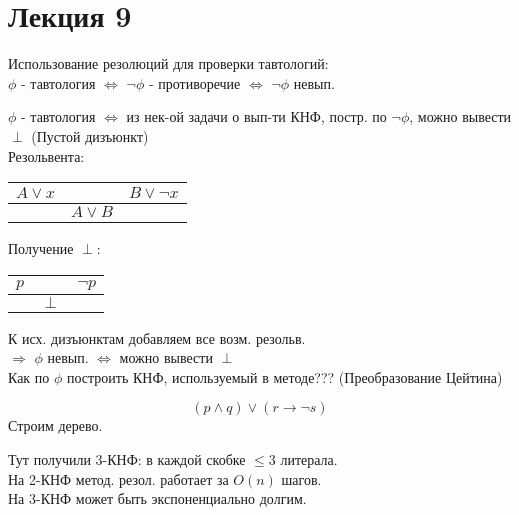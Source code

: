 \section{Лекция 9}
Использование резолюций для проверки тавтологий: \\

$\phi$ - тавтология $\iff$ $\neg \phi$ - противоречие $\iff$ $\neg \phi$ невып. 

$\phi$ - тавтология $\iff$ из нек-ой задачи о вып-ти КНФ, постр. по $\neg \phi$, можно вывести $\perp$ (Пустой дизъюнкт)\\

Резольвента:
\begin{center}
\begin{tabular}{ c c c } 
 $A \lor x$ & & $B \lor \neg x$ \\ 
 \hline
            & $A \lor B$ & 
\end{tabular}
\end{center}

Получение $\perp$:
\begin{center}
\begin{tabular}{ c c c } 
  $p$ & & $\neg p$ \\
 \hline
      & $\perp$ &
\end{tabular}
\end{center}
К исх. дизъюнктам добавляем все возм. резольв. \\
$\Rightarrow$ $\phi$ невып. $\iff$ можно вывести $\perp$ \\
Как по $\phi$ построить КНФ, используемый в методе??? (Преобразование Цейтина) \\
\begin{example}
\[
  (p \land q) \lor (r \rightarrow \neg s)
\]
Строим дерево.
\end{example}

Тут получили 3-КНФ: в каждой скобке $\leq 3$ литерала. \\
На 2-КНФ метод. резол. работает за $O(n)$ шагов. \\
На 3-КНФ может быть экспоненциально долгим. 

